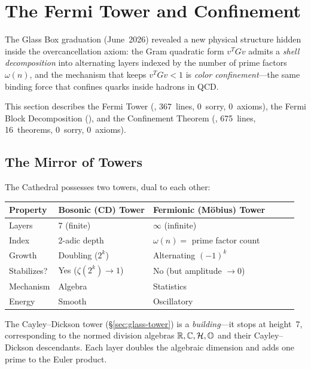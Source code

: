 \section{The Fermi Tower and Confinement}
\label{sec:fermi-tower}

The Glass Box graduation (June~2026) revealed a new physical
structure hidden inside the overcancellation axiom: the Gram
quadratic form $v^T G v$ admits a \emph{shell decomposition}
into alternating layers indexed by the number of prime factors
$\omega(n)$, and the mechanism that keeps $v^T G v < 1$ is
\emph{color confinement}---the same binding force that confines
quarks inside hadrons in QCD.

This section describes the Fermi Tower (,
367~lines, 0~sorry, 0~axioms), the Fermi Block Decomposition
(), and the Confinement Theorem
(, 675~lines, 16~theorems, 0~sorry,
0~axioms).

\subsection{The Mirror of Towers}

The Cathedral possesses two towers, dual to each other:

\begin{center}
\small
\begin{tabular}{@{}llllll@{}}
\toprule
\textbf{Property} & \textbf{Bosonic (CD) Tower} & \textbf{Fermionic (M\"obius) Tower} \\
\midrule
Layers     & 7 (finite)         & $\infty$ (infinite)       \\
Index      & 2-adic depth       & $\omega(n) =$ prime factor count \\
Growth     & Doubling ($2^k$)   & Alternating $(-1)^k$      \\
Stabilizes?& Yes ($\zeta(2^k) \to 1$) & No (but amplitude $\to 0$)  \\
Mechanism  & Algebra            & Statistics                \\
Energy     & Smooth             & Oscillatory               \\
\bottomrule
\end{tabular}
\end{center}

The Cayley--Dickson tower (\S\ref{sec:glass-tower}) is a
\emph{building}---it stops at height~7, corresponding to the
normed division algebras $\mathbb{R}, \mathbb{C}, \mathcal{H}, \mathbb{O}$ and their
Cayley--Dickson descendants. Each layer doubles the algebraic
dimension and adds one prime to the Euler product.

